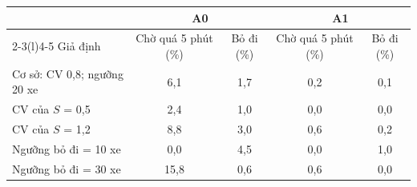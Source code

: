 \begin{tabular}{@{}lcccc@{}}
\toprule
 & \multicolumn{2}{c}{A0} & \multicolumn{2}{c}{A1} \\
\cmidrule(lr){2-3}\cmidrule(l){4-5}
Giả định & Chờ quá 5 phút (\%) & Bỏ đi (\%) & Chờ quá 5 phút (\%) & Bỏ đi (\%) \\
\midrule
Cơ sở: CV 0,8; ngưỡng 20 xe & 6{,}1 & 1{,}7 & 0{,}2 & 0{,}1 \\
CV của $S$ = 0,5 & 2{,}4 & 1{,}0 & 0{,}0 & 0{,}0 \\
CV của $S$ = 1,2 & 8{,}8 & 3{,}0 & 0{,}6 & 0{,}2 \\
Ngưỡng bỏ đi = 10 xe & 0{,}0 & 4{,}5 & 0{,}0 & 1{,}0 \\
Ngưỡng bỏ đi = 30 xe & 15{,}8 & 0{,}6 & 0{,}6 & 0{,}0 \\
\bottomrule
\end{tabular}
